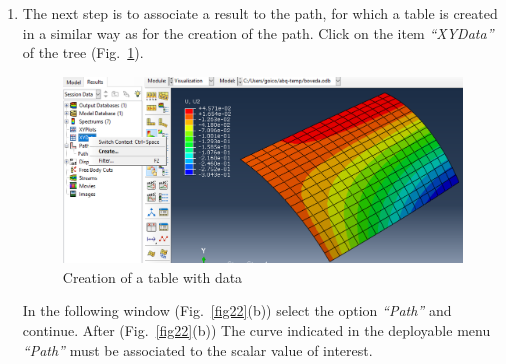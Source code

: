 \documentclass[english,a4paper,12pt]{article}
\begin{document}
\begin{enumerate}
\clearpage
\item 
The next step is to associate a result to the path, for which a table is created in a similar way as for the creation of the path.
Click on the item \emph{``XYData''} of the tree
(Fig.~\ref{fig21}).
\begin{figure}[h!tp]
\centering
	\includegraphics[scale=0.45]{capturas2019/a_fig38.png}
  \caption{Creation of a table with data}
  \label{fig21}
\end{figure}
In the following window
(Fig.~\ref{fig22}(b)) 
select the option \emph{``Path''} and continue.
After
(Fig.~\ref{fig22}(b)) 
The curve indicated in the deployable menu \emph{``Path''} must be associated to the scalar value of interest.
\begin{figure}[h!tp]
\centering

\end{figure}
\end{enumerate}
\end{document}
